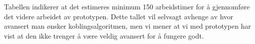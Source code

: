 Tabellen indikerer at det estimeres minimum 150 arbeidstimer for å gjennomføre det videre arbeidet av prototypen. Dette tallet vil selvsagt avhenge av hvor avansert man ønsker koblingsalgoritmen, men vi mener at vi med prototypen har vist at den ikke trenger å være veldig avansert for å fungere godt.